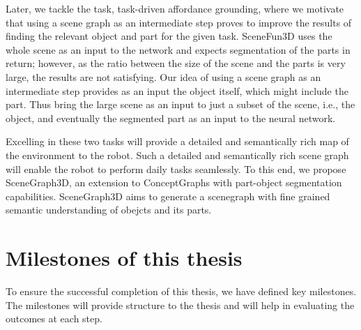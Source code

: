       Later, we tackle the task, task-driven affordance grounding, where we motivate that using a scene graph as an intermediate step proves to 
       improve the results of finding the relevant object and part for the given task. SceneFun3D uses the whole scene as an input to the network 
       and expects segmentation of the parts in return; however, as the ratio between the size of the scene and the parts is very large, 
       the results are not satisfying. Our idea of using a scene graph as an intermediate step provides as an input the object itself, 
       which might include the part. Thus bring the large scene as an input to just a subset of the scene, i.e., the object,
        and eventually the segmented part as an input to the neural network. 
    
        Excelling in these two tasks will provide a detailed and
         semantically rich map of the environment to the robot. Such a detailed and semantically rich scene graph will enable the robot to perform daily tasks seamlessly.
         To this end, we propose SceneGraph3D, an extension to ConceptGraphs with part-object segmentation capabilities. SceneGraph3D aims to
         generate a scenegraph with fine grained semantic understanding of obejcts and its parts.

\section{Milestones of this thesis}
To ensure the successful completion of this thesis, we have defined key milestones. 
The milestones will provide structure to the thesis and will help in evaluating the outcomes at each step.

